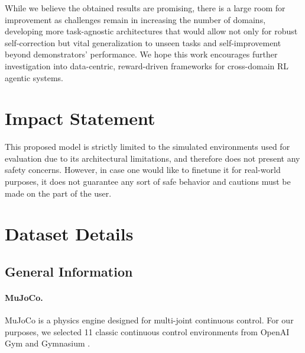 \documentclass{article}
\theoremstyle{plain}
\theoremstyle{definition}
\theoremstyle{remark}
\begin{document}
While we believe the obtained results are promising, there is a large room for improvement as challenges remain in increasing the number of domains, developing more task-agnostic architectures that would allow not only for robust self-correction but vital generalization to unseen tasks and self-improvement beyond demonstrators' performance. We hope this work encourages further investigation into data-centric, reward-driven frameworks for cross-domain RL agentic systems.


\section*{Impact Statement}
This proposed model is strictly limited to the simulated environments used for evaluation due to its architectural limitations, and therefore does not present any safety concerns. However, in case one would like to finetune it for real-world purposes, it does not guarantee any sort of safe behavior and cautions must be made on the part of the user.





\newpage
\appendix
\onecolumn

\section{Dataset Details}\label{appendix:dataset}
\subsection{General Information}\label{appendix:dataset:general-info}

\paragraph{MuJoCo.} MuJoCo \cite{6386109} is a physics engine designed for multi-joint continuous control. For our purposes, we selected 11 classic continuous control environments from OpenAI Gym \cite{brockman2016openaigym} and Gymnasium \cite{towers2024gymnasiumstandardinterfacereinforcement}.
\end{document}

